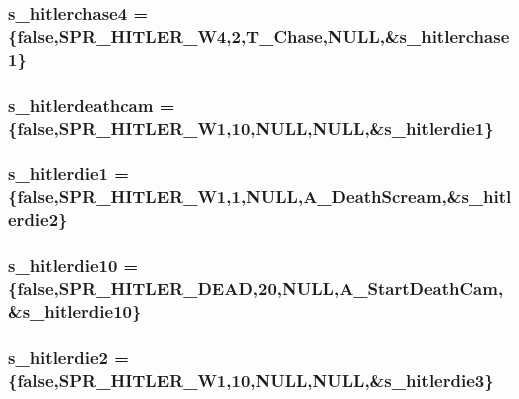 \label{WL__ACT2_8C_a20c282c075c0b1b525d887f2169e22c4}
\hypertarget{WL__ACT2_8C_a196f97a60134c7961016bcb8086bafbe}{
\subsubsection[{s\_\-hitlerchase4}]{ {\bf s\_\-hitlerchase4} = \{false,SPR\_\-HITLER\_\-W4,2,T\_\-Chase,NULL,\&{\bf s\_\-hitlerchase1}\}}}
\label{WL__ACT2_8C_a196f97a60134c7961016bcb8086bafbe}
\hypertarget{WL__ACT2_8C_a033f50c9ac7a7e35061c91dbfd535d92}{
\subsubsection[{s\_\-hitlerdeathcam}]{ {\bf s\_\-hitlerdeathcam} = \{false,SPR\_\-HITLER\_\-W1,10,NULL,NULL,\&{\bf s\_\-hitlerdie1}\}}}
\label{WL__ACT2_8C_a033f50c9ac7a7e35061c91dbfd535d92}
\hypertarget{WL__ACT2_8C_ad89c60be5f4190ae1c95e96b3eff37d2}{
\subsubsection[{s\_\-hitlerdie1}]{ {\bf s\_\-hitlerdie1} = \{false,SPR\_\-HITLER\_\-W1,1,NULL,A\_\-DeathScream,\&{\bf s\_\-hitlerdie2}\}}}
\label{WL__ACT2_8C_ad89c60be5f4190ae1c95e96b3eff37d2}
\hypertarget{WL__ACT2_8C_a248fc0709b6d2aae2cb7e042c095079f}{
\subsubsection[{s\_\-hitlerdie10}]{ {\bf s\_\-hitlerdie10} = \{false,SPR\_\-HITLER\_\-DEAD,20,NULL,A\_\-StartDeathCam,\&{\bf s\_\-hitlerdie10}\}}}
\label{WL__ACT2_8C_a248fc0709b6d2aae2cb7e042c095079f}
\hypertarget{WL__ACT2_8C_a689a9a34510c375d3e7baf3e44a306b1}{
\subsubsection[{s\_\-hitlerdie2}]{ {\bf s\_\-hitlerdie2} = \{false,SPR\_\-HITLER\_\-W1,10,NULL,NULL,\&{\bf s\_\-hitlerdie3}\}}}
